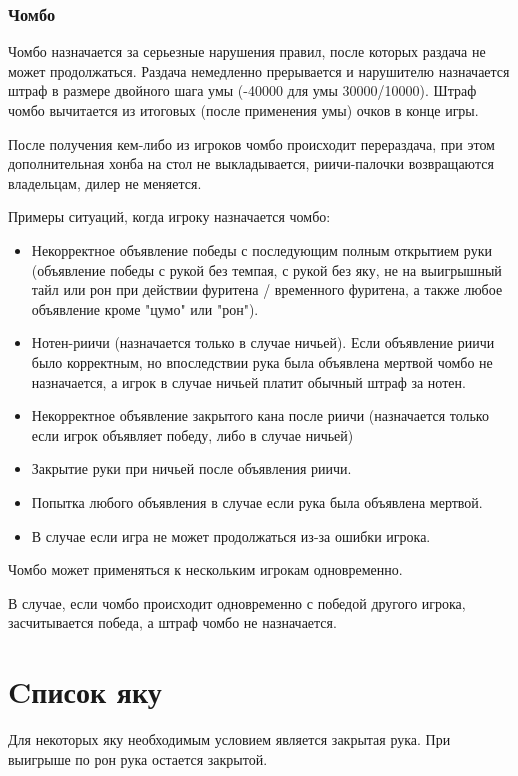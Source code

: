 \subsubsection{Чомбо}

Чомбо назначается за серьезные нарушения правил, после которых раздача не может продолжаться. Раздача немедленно прерывается и нарушителю назначается штраф в размере двойного шага умы (-40000 для умы 30000/10000). Штраф чомбо вычитается из итоговых (после применения умы) очков в конце игры.

После получения кем-либо из игроков чомбо происходит перераздача, при этом дополнительная хонба на стол не выкладывается, риичи-палочки возвращаются владельцам, дилер не меняется.

Примеры ситуаций, когда игроку назначается чомбо:

\begin{itemize}
	\item Некорректное объявление победы с последующим полным открытием руки (объявление победы с рукой без темпая, с рукой без яку, не на выигрышный тайл или рон при действии фуритена / временного фуритена, а также любое объявление кроме "цумо" или "рон").
	\item Нотен-риичи (назначается только в случае ничьей). Если объявление риичи было корректным, но впоследствии рука была объявлена мертвой чомбо не назначается, а игрок в случае ничьей платит обычный штраф за нотен.
	\item Некорректное объявление закрытого кана после риичи (назначается только если игрок объявляет победу, либо в случае ничьей)
	\item Закрытие руки при ничьей после объявления риичи.
	\item Попытка любого объявления в случае если рука была объявлена мертвой.
	\item В случае если игра не может продолжаться из-за ошибки игрока.
\end{itemize}

Чомбо может применяться к нескольким игрокам одновременно.

В случае, если чомбо происходит одновременно с победой другого игрока, засчитывается победа, а штраф чомбо не назначается.

\section{Cписок яку}

Для некоторых яку необходимым условием является закрытая рука. При выигрыше по рон рука остается закрытой.

